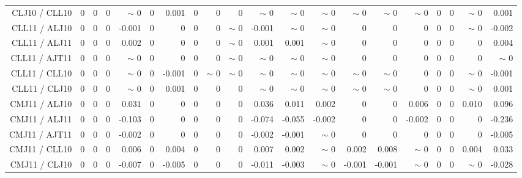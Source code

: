 \begin{table}[H]
\begin{center}
\begin{tabular}{|r|rrrrrrrrrrrrrrrrrr|r|}
CLJ10 / CLL10 &  0 &  0 &  0 &  {\tiny $\sim$ }0 &  0 &      0.001 &  0 &  0 &  0 &  {\tiny $\sim$ }0 &  {\tiny $\sim$ }0 &  {\tiny $\sim$ }0 &  {\tiny $\sim$ }0 &  {\tiny $\sim$ }0 &  {\tiny $\sim$ }0 &  0 &  0 &  {\tiny $\sim$ }0 &      0.001 \\
CLL11 / ALJ10 &  0 &  0 &  0 &     -0.001 &  0 &  0 &  0 &  0 &  {\tiny $\sim$ }0 &     -0.001 &  {\tiny $\sim$ }0 &  {\tiny $\sim$ }0 &  0 &  0 &  0 &  0 &  0 &  {\tiny $\sim$ }0 &     -0.002 \\
CLL11 / ALJ11 &  0 &  0 &  0 &      0.002 &  0 &  0 &  0 &  0 &  {\tiny $\sim$ }0 &      0.001 &      0.001 &  {\tiny $\sim$ }0 &  0 &  0 &  0 &  0 &  0 &  0 &      0.004 \\
CLL11 / AJT11 &  0 &  0 &  0 &  {\tiny $\sim$ }0 &  0 &  0 &  0 &  0 &  {\tiny $\sim$ }0 &  {\tiny $\sim$ }0 &  {\tiny $\sim$ }0 &  {\tiny $\sim$ }0 &  0 &  0 &  0 &  0 &  0 &  0 &  {\tiny $\sim$ }0 \\
CLL11 / CLL10 &  0 &  0 &  0 &  {\tiny $\sim$ }0 &  0 &     -0.001 &  0 &  {\tiny $\sim$ }0 &  {\tiny $\sim$ }0 &  {\tiny $\sim$ }0 &  {\tiny $\sim$ }0 &  {\tiny $\sim$ }0 &  {\tiny $\sim$ }0 &  {\tiny $\sim$ }0 &  0 &  0 &  0 &  {\tiny $\sim$ }0 &     -0.001 \\
CLL11 / CLJ10 &  0 &  0 &  0 &  {\tiny $\sim$ }0 &  0 &      0.001 &  0 &  0 &  0 &  {\tiny $\sim$ }0 &  {\tiny $\sim$ }0 &  {\tiny $\sim$ }0 &  {\tiny $\sim$ }0 &  {\tiny $\sim$ }0 &  0 &  0 &  0 &  {\tiny $\sim$ }0 &      0.001 \\
CMJ11 / ALJ10 &  0 &  0 &  0 &      0.031 &  0 &  0 &  0 &  0 &  0 &      0.036 &      0.011 &      0.002 &  0 &  0 &      0.006 &  0 &  0 &      0.010 &  \colorbox{Yellow1}{    0.096} \\
CMJ11 / ALJ11 &  0 &  0 &  0 &     -0.103 &  0 &  0 &  0 &  0 &  0 &     -0.074 &     -0.055 &     -0.002 &  0 &  0 &     -0.002 &  0 &  0 &  0 &     -0.236 \\
CMJ11 / AJT11 &  0 &  0 &  0 &     -0.002 &  0 &  0 &  0 &  0 &  0 &     -0.002 &     -0.001 &  {\tiny $\sim$ }0 &  0 &  0 &  0 &  0 &  0 &  0 &     -0.005 \\
CMJ11 / CLL10 &  0 &  0 &  0 &      0.006 &  0 &      0.004 &  0 &  0 &  0 &      0.007 &      0.002 &  {\tiny $\sim$ }0 &      0.002 &      0.008 &  {\tiny $\sim$ }0 &  0 &  0 &      0.004 &      0.033 \\
CMJ11 / CLJ10 &  0 &  0 &  0 &     -0.007 &  0 &     -0.005 &  0 &  0 &  0 &     -0.011 &     -0.003 &  {\tiny $\sim$ }0 &     -0.001 &     -0.001 &  {\tiny $\sim$ }0 &  0 &  0 &  {\tiny $\sim$ }0 &     -0.028 \\

\end{tabular}
\end{center}
\end{table}

